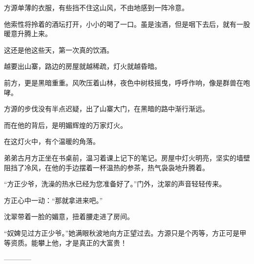 \begin{this_body}
方源单薄的衣服，有些挡不住这山风，不由地感到一阵冷意。

他索性将拎着的酒坛打开，小小的喝了一口。虽是浊酒，但是咽下去后，就有一股暖意升腾上来。

这还是他这些天，第一次真的饮酒。

越要出山寨，路边的房屋就越稀疏，灯火就越昏暗。

前方，更是黑暗重重。风吹压着山林，夜色中树枝摇曳，呼呼作响，像是群兽在咆哮。

方源的步伐没有半点迟疑，出了山寨大门，在黑暗的路中渐行渐远。

而在他的背后，是明媚辉煌的万家灯火。

在这灯火中，有个温暖的角落。

弟弟古月方正坐在书桌前，温习着课上记下的笔记。房屋中灯火明亮，坚实的墙壁阻挡了冷风，在他的手边摆着一杯温热的参茶，热气袅袅地升腾着。

“方正少爷，洗澡的热水已经为您准备好了。”门外，沈翠的声音轻轻传来。

方正心中一动：“那就拿进来吧。”

沈翠带着一脸的媚意，扭着腰走进了房间。

“奴婢见过方正少爷。”她满眼秋波地向方正望过去。方源只是个丙等，方正可是甲等资质。能攀上他，才是真正的大富贵！

------------

\end{this_body}

